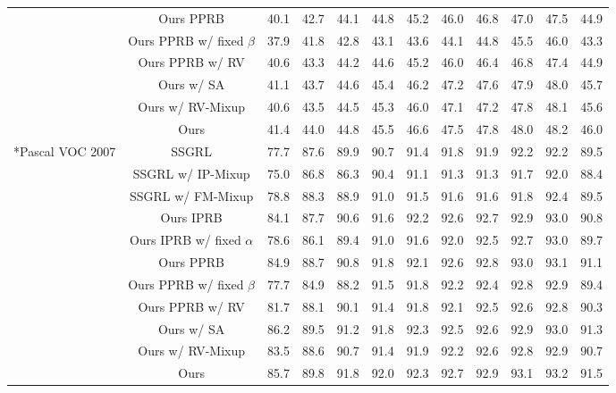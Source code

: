 \documentclass[lettersize,journal]{IEEEtran}
\begin{document}
\begin{table*}
\begin{tabular}{c|c|ccccccccc|c}
  \centering ~ & Ours PPRB & 40.1 & 42.7 & 44.1 & 44.8 & 45.2 & 46.0 & 46.8 & 47.0 & 47.5 & 44.9 \\
  \centering ~ & Ours PPRB w/ fixed $\beta$ & 37.9 & 41.8 & 42.8 & 43.1 & 43.6 & 44.1 & 44.8 & 45.5 & 46.0 & 43.3 \\
  \centering ~ & Ours PPRB w/ RV & 40.6 & 43.3 & 44.2 & 44.6 & 45.2 & 46.0 & 46.4 & 46.8 & 47.4 & 44.9 \\
  \centering ~ & Ours w/ SA & 41.1 & 43.7 & 44.6 & 45.4 & 46.2 & 47.2 & 47.6 & 47.9 & 48.0 & 45.7 \\
  \centering ~ & Ours w/ RV-Mixup & 40.6 & 43.5 & 44.5 & 45.3 & 46.0 & 47.1 & 47.2 & 47.8 & 48.1 & 45.6 \\
  \centering ~ & Ours & 41.4 & 44.0 & 44.8 & 45.5 & 46.6 & 47.5 & 47.8 & 48.0 & 48.2 & 46.0 \\
  \hline
  \hline
  \centering \multirow{10}*{Pascal VOC 2007} & SSGRL & 77.7 & 87.6 & 89.9 & 90.7 & 91.4 & 91.8 & 91.9 & 92.2 & 92.2 & 89.5 \\
  \centering ~ & SSGRL w/ IP-Mixup & 75.0 & 86.8 & 86.3 & 90.4 & 91.1 & 91.3 & 91.3 & 91.7 & 92.0 & 88.4 \\
  \centering ~ & SSGRL w/ FM-Mixup & 78.8 & 88.3 & 88.9 & 91.0 & 91.5 & 91.6 & 91.6 & 91.8 & 92.4 & 89.5 \\
  \centering ~ & Ours IPRB & 84.1 & 87.7 & 90.6 & 91.6 & 92.2 & 92.6 & 92.7 & 92.9 & 93.0 & 90.8 \\
  \centering ~ & Ours IPRB w/ fixed $\alpha$ & 78.6 & 86.1 & 89.4 & 91.0 & 91.6 & 92.0 & 92.5 & 92.7 & 93.0 & 89.7 \\
  \centering ~ & Ours PPRB & 84.9 & 88.7 & 90.8 & 91.8 & 92.1 & 92.6 & 92.8 & 93.0 & 93.1 & 91.1 \\
  \centering ~ & Ours PPRB w/ fixed $\beta$ & 77.7 & 84.9 & 88.2 & 91.5 & 91.8 & 92.2 & 92.4 & 92.8 & 92.9 & 89.4 \\
  \centering ~ & Ours PPRB w/ RV & 81.7 & 88.1 & 90.1 & 91.4 & 91.8 & 92.1 & 92.5 & 92.6 & 92.8 & 90.3 \\
  \centering ~ & Ours w/ SA & 86.2 & 89.5 & 91.2 & 91.8 & 92.3 & 92.5 & 92.6 & 92.9 & 93.0 & 91.3 \\
  \centering ~ & Ours w/ RV-Mixup & 83.5 & 88.6 & 90.7 & 91.4 & 91.9 & 92.2 & 92.6 & 92.8 & 92.9 & 90.7 \\
  \centering ~ & Ours & 85.7 & 89.8 & 91.8 & 92.0 & 92.3 & 92.7 & 92.9 & 93.1 & 93.2 & 91.5 \\
  \hline      
  \end{tabular}
  \vspace{10pt}

\end{table*}
\end{document}
